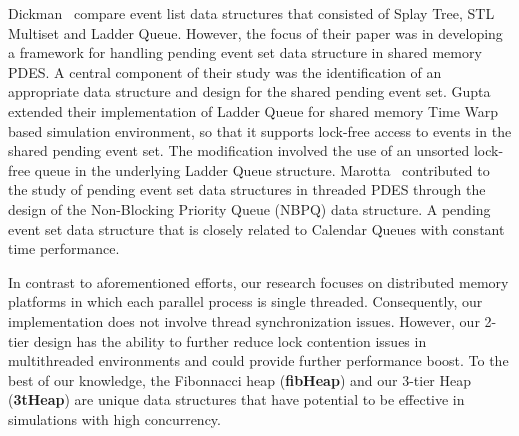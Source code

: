 Dickman~\cite{dickman-13} compare event list data structures that consisted of Splay Tree, STL Multiset and Ladder Queue. However, the focus of their paper was in developing a framework for handling pending event set data structure in shared memory PDES. A central component of their study was the identification of an appropriate data structure and design for the shared pending event set. Gupta~\cite{gupta-14} extended their implementation of Ladder Queue for shared memory Time Warp based simulation environment, so that it supports lock-free access to events in the shared pending event set. The modification involved the use of an unsorted lock-free queue in the underlying Ladder Queue structure. Marotta~\cite{marotta-16} contributed to the study of pending event set data structures in threaded PDES through the design of the Non-Blocking Priority Queue (NBPQ) data structure. A pending event set data structure that is closely related to Calendar Queues with constant time performance.

In contrast to aforementioned efforts, our research focuses on distributed memory platforms in which each parallel process is single threaded. Consequently, our implementation does not involve thread synchronization issues. However, our 2-tier design has the ability to further reduce lock contention issues in multithreaded environments and could provide further performance boost. To the best of our knowledge, the Fibonnacci heap (\textbf{fibHeap}) and our 3-tier Heap (\textbf{3tHeap}) are unique data structures that have potential to be effective in simulations with high concurrency.



    
    

    
